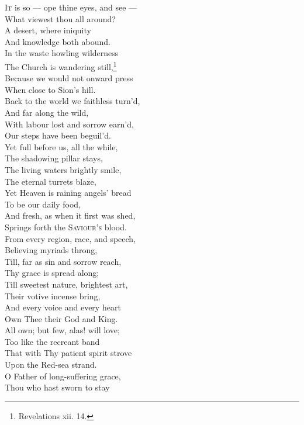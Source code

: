 \textsc{It} is so — ope thine eyes, and see — \\
 What viewest thou all around? \\
 A desert, where iniquity \\
 And knowledge both abound. \\
  In the waste howling wilderness \\
 The Church is wandering still,\footnote{Revelations xii. 14.} \\
 Because we would not onward press \\
 When close to Sion’s hill. \\
  Back to the world we faithless turn’d, \\
 And far along the wild, \\
 With labour lost and sorrow earn’d, \\
 Our steps have been beguil’d. \\
  Yet full before us, all the while, \\
 The shadowing pillar stays, \\
 The living waters brightly smile, \\
 The eternal turrets blaze, \\
  Yet Heaven is raining angels’ bread \\
 To be our daily food, \\
 And fresh, as when it first was shed, \\
 Springs forth the \textsc{Saviour’s} blood. \\
  From every region, race, and speech, \\
 Believing myriads throng, \\
 Till, far as sin and sorrow reach, \\
 Thy grace is spread along; \\
  Till sweetest nature, brightest art, \\
 Their votive incense bring, \\
 And every voice and every heart \\
 Own Thee their God and King. \\
  All own; but few, alas! will love; \\
 Too like the recreant band \\
 That with Thy patient spirit strove \\
 Upon the Red-sea strand. \\
  O Father of long-suffering grace, \\
 Thou who hast sworn to stay \\
